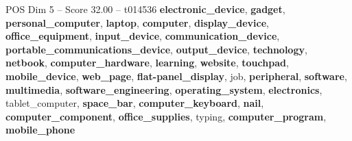 \begin{textsample}{POS Dim 5 – Score 32.00 – t014536}  \label{ex:f5_pos_015}
\textbf{electronic\_device}, \textbf{gadget}, \textbf{personal\_computer}, \textbf{laptop}, \textbf{computer}, \textbf{display\_device}, \textbf{office\_equipment}, \textbf{input\_device}, \textbf{communication\_device}, \textbf{portable\_communications\_device}, \textbf{output\_device}, \textbf{technology}, \textbf{netbook}, \textbf{computer\_hardware}, \textbf{learning}, \textbf{website}, \textbf{touchpad}, \textbf{mobile\_device}, \textbf{web\_page}, \textbf{flat-panel\_display}, job, \textbf{peripheral}, \textbf{software}, \textbf{multimedia}, \textbf{software\_engineering}, \textbf{operating\_system}, \textbf{electronics}, tablet\_computer, \textbf{space\_bar}, \textbf{computer\_keyboard}, \textbf{nail}, \textbf{computer\_component}, \textbf{office\_supplies}, typing, \textbf{computer\_program}, \textbf{mobile\_phone}

\end{textsample}

